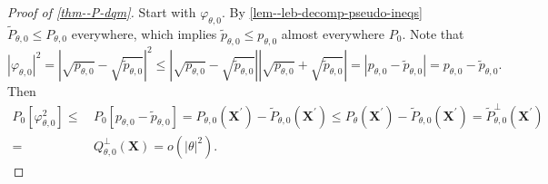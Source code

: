 \documentclass[12pt]{article}
\let\Cref\autoref
\theoremstyle{definition}
\theoremstyle{plain}
\begin{document}
\begin{proof}[Proof of \Cref{thm--P-dqm}]
Start with \(\varphi_{\theta, 0}\).
By \Cref{lem--leb-decomp-pseudo-ineqs} \(\tilde{P}_{\theta, 0} \leq
P_{\theta, 0}\) everywhere, which implies \(\tilde{p}_{\theta, 0} \leq
p_{\theta, 0}\) almost everywhere \(P_{0}\).
Note that
\begin{equation*}
    \left| \varphi_{\theta, 0} \right|^{2} = \left| \sqrt{p_{\theta, 0}} -
    \sqrt{\tilde{p}_{\theta, 0}} \right|^{2} \leq \left| \sqrt{p_{\theta, 0}} -
    \sqrt{\tilde{p}_{\theta, 0}} \right| \left| \sqrt{p_{\theta, 0}} +
    \sqrt{\tilde{p}_{\theta, 0}} \right| = \left| p_{\theta, 0} -
    \tilde{p}_{\theta, 0} \right| = p_{\theta, 0} - \tilde{p}_{\theta, 0}.
\end{equation*}
Then
\begin{equation}
  \begin{split}
    P_{0} \left[ \varphi_{\theta, 0}^{2} \right] \leq
    & \,
    P_{0} \left[ p_{\theta, 0} - \tilde{p}_{\theta, 0} \right] = P_{\theta, 0}
    \left( \mathbf{X}^{\prime} \right) - \tilde{P}_{\theta, 0} \left(
    \mathbf{X}^{\prime} \right) \leq P_{\theta} \left( \mathbf{X}^{\prime}
    \right) - \tilde{P}_{\theta, 0} \left( \mathbf{X}^{\prime} \right) =
    \tilde{P}_{\theta, 0}^{\perp} \left( \mathbf{X}^{\prime} \right) \\
    =
    & \, Q_{\theta, 0}^{\perp} (\mathbf{X}) = o \left( |\theta|^{2} \right).
  \end{split}
  \label{eqn--ac-part-rem-neg}
\end{equation}


\end{proof}
\end{document}
